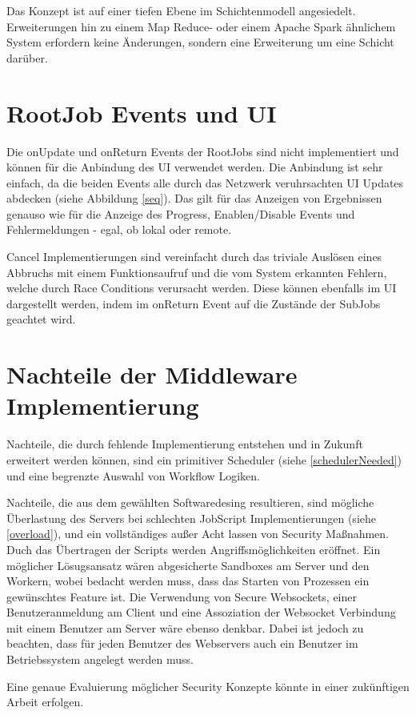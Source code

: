 Das Konzept ist auf einer tiefen Ebene im Schichtenmodell angesiedelt. Erweiterungen hin zu einem Map Reduce- oder einem Apache Spark ähnlichem System erfordern keine Änderungen, sondern eine Erweiterung um eine Schicht darüber.


\section{RootJob Events und UI}
Die onUpdate und onReturn Events der RootJobs sind nicht implementiert und können für die Anbindung des UI verwendet werden.
Die Anbindung ist sehr einfach, da die beiden Events alle durch das Netzwerk veruhrsachten UI Updates abdecken (siehe Abbildung \ref{seq}).
Das gilt für das Anzeigen von Ergebnissen genauso wie für die Anzeige des Progress, Enablen/Disable Events und Fehlermeldungen - egal, ob lokal oder remote.

Cancel Implementierungen sind vereinfacht durch das triviale Auslösen eines Abbruchs mit einem Funktionsaufruf und die vom System erkannten Fehlern, welche durch Race Conditions verursacht werden. Diese können ebenfalls im UI dargestellt werden, indem im onReturn Event auf die Zustände der SubJobs geachtet wird.



\clearpage
\section{Nachteile der Middleware Implementierung}
Nachteile, die durch fehlende Implementierung entstehen und in Zukunft erweitert werden können, sind ein primitiver Scheduler (siehe \ref{schedulerNeeded}) und eine begrenzte Auswahl von Workflow Logiken.

Nachteile, die aus dem gewählten Softwaredesing resultieren, sind mögliche Überlastung des Servers bei schlechten JobScript Implementierungen (siehe \ref{overload}), und ein vollständiges außer Acht lassen von Security Maßnahmen. Duch das Übertragen der Scripts werden Angriffsmöglichkeiten eröffnet. Ein möglicher Lösugsansatz wären abgesicherte Sandboxes am Server und den Workern, wobei bedacht werden muss, dass das Starten von Prozessen ein gewünschtes Feature ist.
Die Verwendung von Secure Websockets, einer Benutzeranmeldung am Client und eine Assoziation der Websocket Verbindung mit einem Benutzer am Server wäre ebenso denkbar. Dabei ist jedoch zu beachten, dass für jeden Benutzer des Webservers auch ein Benutzer im Betriebssystem angelegt werden muss.

Eine genaue Evaluierung möglicher Security Konzepte könnte in einer zukünftigen Arbeit erfolgen.




